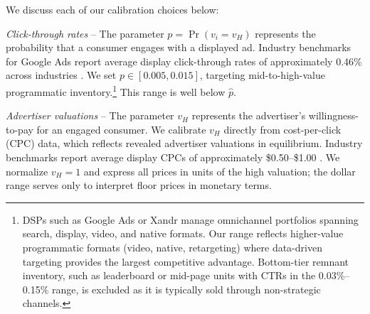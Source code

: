 \documentclass[11pt]{article}
\theoremstyle{plain}
\theoremstyle{definition}
\theoremstyle{plain}
\theoremstyle{plain}
\theoremstyle{plain}
\theoremstyle{plain}
\numberwithin{equation}{section}
\begin{document}
\noindent We discuss each of our calibration choices below:\par
\vspace{1mm}
\noindent \textit{Click-through rates} -- The parameter $p = \Pr(v_i = v_H)$ represents the probability that a consumer engages with a displayed ad. Industry benchmarks for Google Ads report average display click-through rates of approximately 0.46\% across industries \parencite{irvineGoogleAdsBenchmarks}. We set $p \in [0.005, 0.015]$, targeting mid-to-high-value programmatic inventory.\footnote{DSPs such as Google Ads or Xandr manage omnichannel portfolios spanning search, display, video, and native formats. Our range reflects higher-value programmatic formats (video, native, retargeting) where data-driven targeting provides the largest competitive advantage. Bottom-tier remnant inventory, such as leaderboard or mid-page units with CTRs in the 0.03\%--0.15\% range, is excluded as it is typically sold through non-strategic channels.} This range is well below $\hat{p}$. \par
\vspace{1mm}
\noindent \textit{Advertiser valuations} -- The parameter $v_H$ represents the advertiser's willingness-to-pay for an engaged consumer. We calibrate $v_H$ directly from cost-per-click (CPC) data, which reflects revealed advertiser valuations in equilibrium. Industry benchmarks report average display CPCs of approximately \$0.50--\$1.00 \parencite{irvineGoogleAdsBenchmarks}. We normalize $v_H = 1$ and express all prices in units of the high valuation; the dollar range serves only to interpret floor prices in monetary terms. \par
\vspace{1mm}
\end{document}
